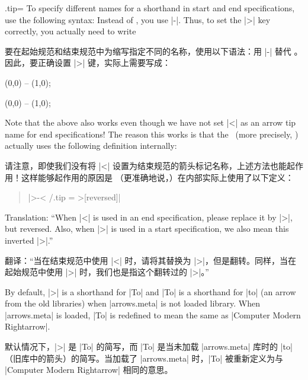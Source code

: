 \begin{handler}{{.tip}{=}}
To specify different names for a shorthand in start and end specifications,
    use the following syntax: Instead of , you use |-|. Thus, to set the
    |>| key correctly, you actually need to write
    
    要在起始规范和结束规范中为缩写指定不同的名称，使用以下语法：用 |-| 替代 。因此，要正确设置 |>| 键，实际上需要写成：

\begin{codeexample}[preamble={\usetikzlibrary{arrows.meta}}]
\tikz [<-> /.tip = Stealth] \draw [<->>] (0,0) -- (1,0);
\end{codeexample}
\begin{codeexample}[preamble={\usetikzlibrary{arrows.meta}}]
\tikz [<-> /.tip = Latex] \draw [>-<] (0,0) -- (1,0);
\end{codeexample}

    Note that the above also works even though we have not set |<| as an arrow
    tip name for end specifications! The reason this works is that the
    \tikzname\ (more precisely, \pgfname) actually uses the following
    definition internally:

    请注意，即使我们没有将 |<| 设置为结束规范的箭头标记名称，上述方法也能起作用！这样能够起作用的原因是 \tikzname（更准确地说，\pgfname ）在内部实际上使用了以下定义：

    \begin{quote}
        |>-< /.tip = >[reversed]|
    \end{quote}
    Translation: ``When |<| is used in an end specification, please replace it
    by |>|, but reversed. Also, when |>| is used in a start specification, we
    also mean this inverted |>|.''

    翻译：“当在结束规范中使用 |<| 时，请将其替换为 |>|，但是翻转。同样，当在起始规范中使用 |>| 时，我们也是指这个翻转过的 |>|。”


    By default, |>| is a shorthand for |To| and |To| is a shorthand for |to|
    (an arrow from the old libraries) when |arrows.meta| is not loaded library.
    When |arrows.meta| is loaded, |To| is redefined to mean the same as
    |Computer Modern Rightarrow|.

    默认情况下，|>| 是 |To| 的简写，而 |To| 是当未加载 |arrows.meta| 库时的 |to|（旧库中的箭头）的简写。当加载了 |arrows.meta| 时，|To| 被重新定义为与 |Computer Modern Rightarrow| 相同的意思。

\end{handler}

